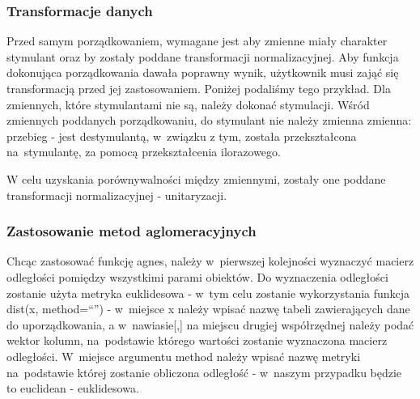 \documentclass[12pt,a4paper]{report}
\begin{document}
{\subsubsection{Transformacje danych}\label{transformacje-danych}

Przed samym porządkowaniem, wymagane jest aby zmienne miały charakter
stymulant oraz by zostały poddane transformacji normalizacyjnej. Aby
funkcja dokonująca porządkowania dawała poprawny wynik, użytkownik musi
zająć się transformacją przed jej zastosowaniem. Poniżej podaliśmy tego
przykład. Dla zmiennych, które stymulantami nie są, należy dokonać
stymulacji. Wśród zmiennych poddanych porządkowaniu, do stymulant
nie należy zmienna zmienna: przebieg - jest destymulantą, w~związku z
tym, została przekształcona na~stymulantę, za pomocą przekształcenia
ilorazowego.


\begin{Shaded}
\begin{Highlighting}[]
\NormalTok{)}
\end{Highlighting}
\end{Shaded}

W celu uzyskania porównywalności między zmiennymi, zostały one poddane
transformacji normalizacyjnej - unitaryzacji.

\begin{Shaded}
\begin{Highlighting}[]
\end{Highlighting}
\end{Shaded}

\subsubsection{Zastosowanie metod aglomeracyjnych}


Chcąc zastosować funkcję agnes, należy w~pierwszej kolejności wyznaczyć
macierz odległości pomiędzy wszystkimi parami obiektów. Do wyznaczenia
odległości zostanie użyta metryka euklidesowa - w~tym celu zostanie
wykorzystania funkcja dist(x, method=``'') - w~miejsce x należy wpisać
nazwę tabeli zawierających dane do uporządkowania, a w~nawiasie{[},{]}
na miejscu drugiej współrzędnej należy podać wektor kolumn, na~podstawie
którego wartości zostanie wyznaczona macierz odległości. W~miejsce
argumentu method należy wpisać nazwę metryki na~podstawie której zostanie
obliczona odległość - w~naszym przypadku będzie to euclidean -
euklidesowa.

}
\end{document}
